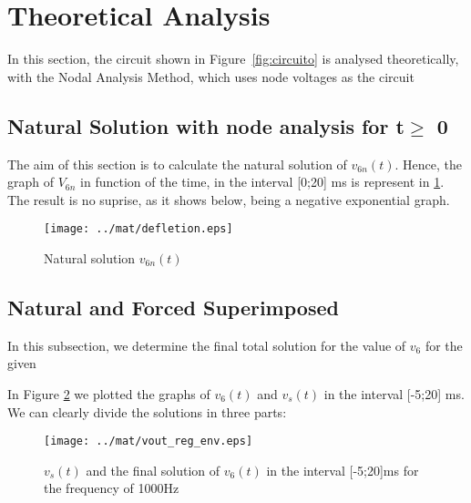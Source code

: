 \section{Theoretical Analysis}
\label{sec:analysis}

\hspace{0,5cm} In this section, the circuit shown in Figure~\ref{fig:circuito} is analysed theoretically, with the Nodal Analysis Method, which uses node voltages as the circuit 


\subsection{Natural Solution with node analysis for t$\geq$ 0}
The aim of this section is to calculate the natural solution of $v_{6n} (t)$. 
Hence, the graph of $V_{6n}$ in function of the time, in the interval [0;20] ms is represent in \ref{fig:mat3}. The result is no suprise, as it shows below, being a negative exponential graph.

\begin{figure}[H] \centering
\texttt{[image: ../mat/defletion.eps]}
\caption{Natural solution $v_{6n} (t)$} 
\label{fig:mat3}
\end{figure}


\subsection{Natural and Forced Superimposed}
In this subsection, we determine the final total solution for the value of $v_6$ for the given 

In Figure \ref{fig:mat4} we plotted the graphs of $v_6(t)$ and $v_s(t)$ in the interval [-5;20] ms. We can clearly divide the solutions in three parts:


\begin{figure}[H] \centering
\texttt{[image: ../mat/vout\_reg\_env.eps]}
\caption{$v_s(t)$ and the final solution of $v_6(t)$ in the interval [-5;20]ms for the frequency of 1000Hz}
\label{fig:mat4}
\end{figure}





